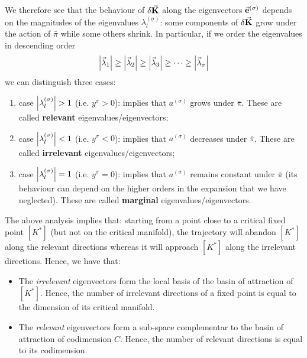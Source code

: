 \documentclass[../../Main/Main.tex]{subfiles}
\begin{document}
We therefore see that the behaviour of \( \delta \va{K} \)  along the eigenvectors \( \va{e}^{(\sigma )} \)  depends on the magnitudes of the eigenvalues \( \lambda_l^{(\sigma )} \): some components of \( \delta \va{K} \) grow under the action of \( \bar{\pi }  \) while some others shrink. In particular, if we order the eigenvalues in descending order
\begin{equation*}
  \abs{\va{\lambda }_1} \ge \abs{\va{\lambda }_2} \ge \abs{\va{\lambda }_3} \ge \dots \ge \abs{\va{\lambda }_{\sigma}}
\end{equation*}
we can distinguish three cases:
\begin{enumerate}
\item case \( \abs{\lambda_l ^{(\sigma )}} > 1 \) (i.e. \( y^\sigma > 0\)): implies that \( a^{(\sigma )} \) grows under \( \bar{\pi }  \). These are called \textbf{relevant} eigenvalues/eigenvectors;

\item case \( \abs{\lambda_l ^{(\sigma )}} < 1 \) (i.e. \( y^\sigma < 0\)): implies that \( a^{(\sigma )} \) decreases under \( \bar{\pi }  \). These are called \textbf{irrelevant} eigenvalues/eigenvectors;

\item case \( \abs{\lambda_l ^{(\sigma )}} = 1 \) (i.e. \( y^\sigma =  0\)): implies that \( a^{(\sigma )} \) remains constant under \( \bar{\pi }  \) (its behaviour can depend on the higher orders in the expansion that we have neglected). These are called \textbf{marginal} eigenvalues/eigenvectors.
\end{enumerate}

The above analysis implies that: starting from a point close to a critical fixed point \( [K^*] \) (but not on the critical manifold), the trajectory will abandon \( [K^*] \) along the relevant directions whereas it will approach \( [K^*] \) along the irrelevant directions. Hence, we have that:
\begin{itemize}
\item The \emph{irrelevant} eigenvectors form the local basis of the basin of attraction of \( [K^*] \). Hence, the number of irrelevant directions of a fixed point is equal to the dimension of its critical manifold.
\item The \emph{relevant} eigenvectors form a sub-space complementar to the basin of attraction of codimension \( C \). Hence, the number of relevant directions is equal to its codimension.
\end{itemize}
\end{document}
